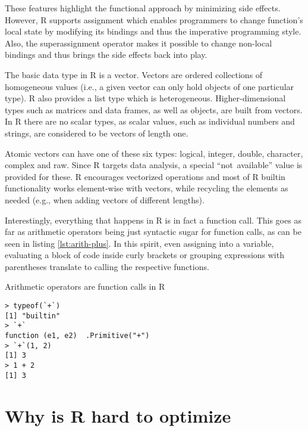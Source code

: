 These features highlight the functional approach by minimizing side effects. However, R supports assignment which enables programmers to change function's local state by modifying its bindings and thus the imperative programming style. Also, the superassignment operator makes it possible to change non-local bindings and thus brings the side effects back into play.

The basic data type in R is a vector. Vectors are ordered collections of homogeneous values (i.e., a given vector can only hold objects of one particular type). R also provides a list type which is heterogeneous. Higher-dimensional types such as matrices and data frames, as well as objects, are built from vectors. In R there are no scalar types, as scalar values, such as individual numbers and strings, are considered to be vectors of length one.

Atomic vectors can have one of these six types: logical, integer, double, character, complex and raw. Since R targets data analysis, a special ``not~available'' value is provided for these. R encourages vectorized operations and most of R builtin functionality works element-wise with vectors, while recycling the elements as needed (e.g., when adding vectors of different lengths).


Interestingly, everything that happens in R is in fact a function call. This goes as far as arithmetic operators being just syntactic sugar for function calls, as can be seen in listing \ref{lst:arith-plus}. In this spirit, even assigning into a variable, evaluating a block of code inside curly brackets or grouping expressions with parentheses translate to calling the respective functions.

\begin{listing}[htbp]
  \caption{\label{lst:arith-plus}Arithmetic operators are function calls in R}
  \begin{verbatim}
> typeof(`+`)
[1] "builtin"
> `+`
function (e1, e2)  .Primitive("+")
> `+`(1, 2)
[1] 3
> 1 + 2
[1] 3
  \end{verbatim}
\end{listing}


\section{Why is R hard to optimize}


